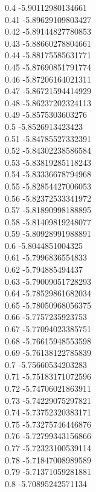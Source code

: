 {0.4	-5.90112980134661\\
0.41	-5.89629109803427\\
0.42	-5.89144827780853\\
0.43	-5.88660278804661\\
0.44	-5.88175585631771\\
0.45	-5.87690851791774\\
0.46	-5.87206164021311\\
0.47	-5.86721594414929\\
0.48	-5.86237202324113\\
0.49	-5.8575303603276\\
0.5	-5.8526913423423\\
0.51	-5.84785527332391\\
0.52	-5.84302238586584\\
0.53	-5.83819285118243\\
0.54	-5.83336678794968\\
0.55	-5.82854427006053\\
0.56	-5.82372533341972\\
0.57	-5.81890998188895\\
0.58	-5.81409819248077\\
0.59	-5.80928991988891\\
0.6	-5.8044851004325\\
0.61	-5.7996836554833\\
0.62	-5.794885494437\\
0.63	-5.79009051728293\\
0.64	-5.78529861682034\\
0.65	-5.78050968056375\\
0.66	-5.7757235923753\\
0.67	-5.77094023385751\\
0.68	-5.76615948553598\\
0.69	-5.76138122785839\\
0.7	-5.75660534203283\\
0.71	-5.75183171072596\\
0.72	-5.74706021863911\\
0.73	-5.74229075297821\\
0.74	-5.73752320383171\\
0.75	-5.73275746446876\\
0.76	-5.72799343156866\\
0.77	-5.72323100539114\\
0.78	-5.71847008989589\\
0.79	-5.71371059281881\\
0.8	-5.70895242571134\\
}

